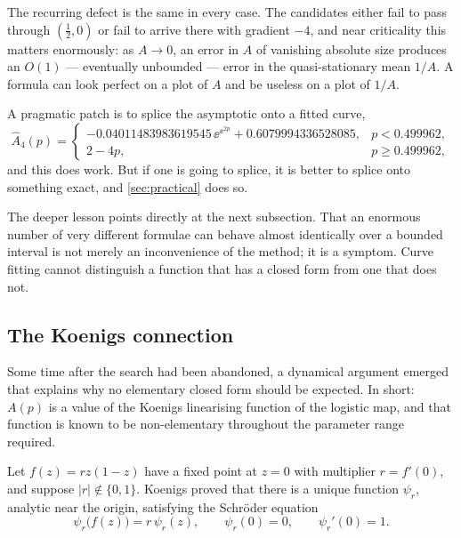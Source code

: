 The recurring defect is the same in every case. The candidates either fail to pass
through $(\tfrac12,0)$ or fail to arrive there with gradient $-4$, and near
criticality this matters enormously: as $A\to0$, an error in $A$ of vanishing
absolute size produces an $O(1)$ --- eventually unbounded --- error in the
quasi-stationary mean $1/A$. A formula can look perfect on a plot of $A$ and be
useless on a plot of $1/A$.

A pragmatic patch is to splice the asymptotic onto a fitted curve,
\begin{equation}
\label{eq:A4hat}
\hat A_4(p) =
\begin{cases}
-0.04011483983619545\,\ee^{\ee^{2p}} + 0.6079994336528085, & p<0.499962,\\[2mm]
2-4p, & p\ge0.499962,
\end{cases}
\end{equation}
and this does work. But if one is going to splice, it is better to splice onto
something exact, and \cref{sec:practical} does so.

The deeper lesson points directly at the next subsection. That an enormous number
of very different formulae can behave almost identically over a bounded interval is
not merely an inconvenience of the method; it is a symptom. Curve fitting cannot
distinguish a function that has a closed form from one that does not.

\subsection{The Koenigs connection}
\label{sec:koenigs}

Some time after the search had been abandoned, a dynamical argument emerged that
explains why no elementary closed form should be expected. In short: $A(p)$ is a
value of the Koenigs linearising function of the logistic map, and that function is
known to be non-elementary throughout the parameter range required.

\begin{definition}
\label{def:koenigs}
Let $f(z) = rz(1-z)$ have a fixed point at $z=0$ with multiplier $r=f'(0)$, and
suppose $|r|\notin\{0,1\}$. Koenigs \cite{Koenigs1884} proved that there is a
unique function $\psi_r$, analytic near the origin, satisfying the Schröder
equation
\begin{equation}
\label{eq:schroder}
\psi_r\bigl(f(z)\bigr) = r\,\psi_r(z),
\qquad
\psi_r(0)=0,
\qquad
\psi_r'(0)=1 .
\end{equation}
\end{definition}

